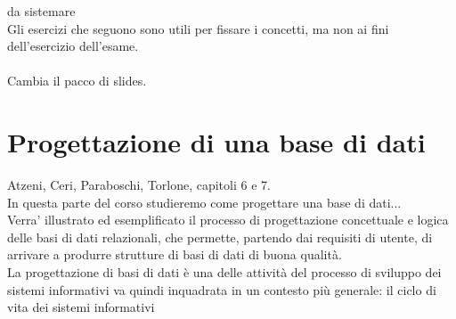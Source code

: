 da sistemare
\\Gli esercizi che seguono sono utili per fissare i concetti, ma non ai fini dell'esercizio dell'esame.
\\
\\Cambia il pacco di slides.

\chapter{Progettazione di una base di dati}
Atzeni, Ceri, Paraboschi, Torlone, capitoli 6 e 7.
\\In questa parte del corso studieremo come
progettare una base di dati...
\\Verra’ illustrato ed esemplificato il processo di
progettazione concettuale e logica delle basi di dati
relazionali, che permette, partendo dai requisiti di
utente, di arrivare a produrre strutture di basi di dati di
buona qualità.
\\La progettazione di basi di dati è una delle attività
del processo di sviluppo dei sistemi informativi va
quindi inquadrata in un contesto più generale: il ciclo
di vita dei sistemi informativi

